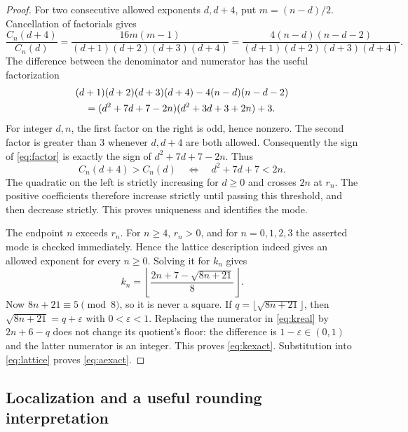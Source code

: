 \documentclass[11pt,letterpaper]{article}
\theoremstyle{remark}
\begin{document}
\begin{proof}
For two consecutive allowed exponents $d,d+4$, put $m=(n-d)/2$.
Cancellation of factorials gives
\begin{equation}\label{eq:fourratio}
 \frac{C_n(d+4)}{C_n(d)}
 =\frac{16m(m-1)}{(d+1)(d+2)(d+3)(d+4)}
 =\frac{4(n-d)(n-d-2)}{(d+1)(d+2)(d+3)(d+4)}.
\end{equation}
The difference between the denominator and numerator has the useful
factorization
\begin{align}
 &(d+1)(d+2)(d+3)(d+4)-4(n-d)(n-d-2)\notag\\
 &\hspace{1em}=
 (d^2+7d+7-2n)(d^2+3d+3+2n)+3.\label{eq:factor}
\end{align}
For integer $d,n$, the first factor on the right is odd, hence nonzero.
The second factor is greater than $3$ whenever $d,d+4$ are both allowed.
Consequently the sign of \eqref{eq:factor} is exactly the sign of
$d^2+7d+7-2n$. Thus
\begin{equation}\label{eq:quadraticcriterion}
 C_n(d+4)>C_n(d)
 \quad\Longleftrightarrow\quad d^2+7d+7<2n.
\end{equation}
The quadratic on the left is strictly increasing for $d\ge0$ and crosses
$2n$ at $r_n$. The positive coefficients therefore increase strictly until
passing this threshold, and then decrease strictly. This proves uniqueness
and identifies the mode.

The endpoint $n$ exceeds $r_n$. For $n\ge4$, $r_n>0$, and for $n=0,1,2,3$
the asserted mode is checked immediately. Hence the lattice description
indeed gives an allowed exponent for every $n\ge0$. Solving it for $k_n$
gives
\begin{equation}\label{eq:kreal}
 k_n=\left\lfloor\frac{2n+7-\sqrt{8n+21}}{8}\right\rfloor.
\end{equation}
Now $8n+21\equiv5\pmod8$, so it is never a square. If
$q=\lfloor\sqrt{8n+21}\rfloor$, then
$\sqrt{8n+21}=q+\varepsilon$ with $0<\varepsilon<1$.
Replacing the numerator in \eqref{eq:kreal} by $2n+6-q$ does not change its
quotient's floor: the difference is $1-\varepsilon\in(0,1)$ and the latter
numerator is an integer. This proves \eqref{eq:kexact}. Substitution into
\eqref{eq:lattice} proves \eqref{eq:aexact}.
\end{proof}

\subsection{Localization and a useful rounding interpretation}
\end{document}
